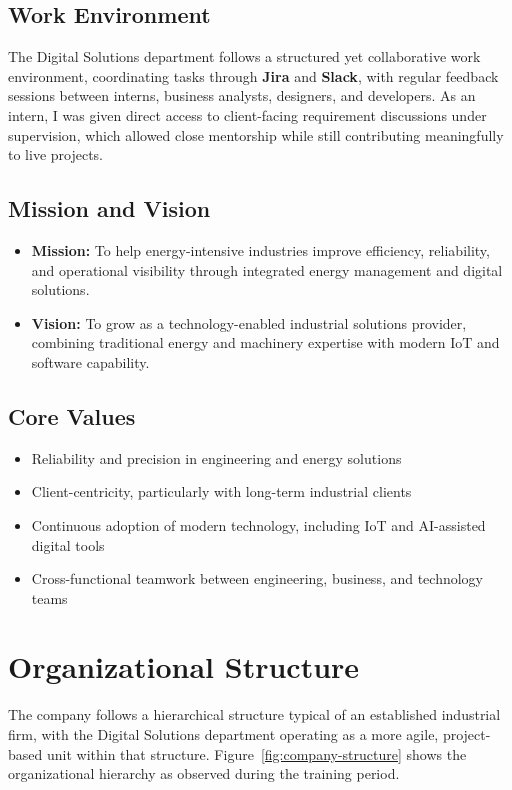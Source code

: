 \subsection{Work Environment}
\par The Digital Solutions department follows a structured yet collaborative work environment, coordinating tasks through \textbf{Jira} and \textbf{Slack}, with regular feedback sessions between interns, business analysts, designers, and developers. As an intern, I was given direct access to client-facing requirement discussions under supervision, which allowed close mentorship while still contributing meaningfully to live projects.

\subsection{Mission and Vision}
\begin{itemize}
    \item \textbf{Mission:} To help energy-intensive industries improve efficiency, reliability, and operational visibility through integrated energy management and digital solutions.
    \item \textbf{Vision:} To grow as a technology-enabled industrial solutions provider, combining traditional energy and machinery expertise with modern IoT and software capability.
\end{itemize}

\subsection{Core Values}
\begin{itemize}
    \item Reliability and precision in engineering and energy solutions
    \item Client-centricity, particularly with long-term industrial clients
    \item Continuous adoption of modern technology, including IoT and AI-assisted digital tools
    \item Cross-functional teamwork between engineering, business, and technology teams
\end{itemize}

\section{Organizational Structure}

\par The company follows a hierarchical structure typical of an established industrial firm, with the Digital Solutions department operating as a more agile, project-based unit within that structure. Figure~\ref{fig:company-structure} shows the organizational hierarchy as observed during the training period.

